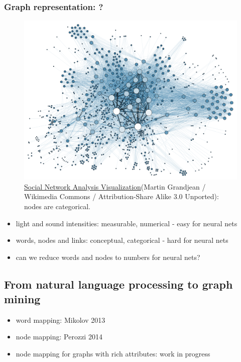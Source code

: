 \documentclass{article}
\begin{document}
\subsubsection{Graph representation: ?}
\begin{figure}[H]
	\centering
	\includegraphics[width=\linewidth]{Social_Network_Analysis_Visualization}
	\caption{ 
	\href{https://commons.wikimedia.org/wiki/File:Social_Network_Analysis_Visualization.png}{Social
	 Network Analysis Visualization}(Martin Grandjean / Wikimedia Commons / 
	Attribution-Share Alike 3.0 Unported): nodes are categorical.}
	\label{fig:Social_Network_Analysis_Visualization}
\end{figure}
\begin{itemize}
	\item light and sound intensities: measurable, numerical - easy for neural 
	nets
	\item words, nodes and links: conceptual, categorical - hard for neural nets
	\item can we reduce words and nodes to numbers for neural nets?
\end{itemize}

\subsection{From natural language processing to graph mining}
\begin{itemize}
	\item word mapping: Mikolov 2013
	\item node mapping: Perozzi 2014
	\item node mapping for graphs with rich attributes: work in progress
\end{itemize}
\end{document}
